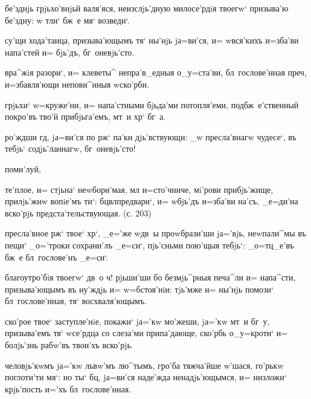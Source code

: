 
  бе'зднjь грjьхо'внjьй валя'яся, 
неизслjь'дную милосе'рдiя твоегw` призыва'ю бе'здну: w\т 
тли` бж~е мя` возведи`.

 су'щи хода'таица, призыва'ющымъ тя` 
ны'нjь jа=ви'ся, и= w\т вся'кихъ и=зба'ви напа'стей и= 
бjь'дъ, бг~оневjь'сто.

 вра^жiя разори`, и= клеветы^ 
непра'в_едныя о_у=ста'ви, бл~гослове'нная преч, 
и=збавля'ющи непови^нныя w\т ско'рби.

  грjьхи` w=круже'ни, и= напа'стными 
бjьда'ми потопля'еми, под\ъ бж~е'ственный покро'въ тво'й 
прибjьга'емъ, мт~и хр` бг~а.

   ро'ждши гд, jа=ви'ся 
по рж` па'ки дjь'вствующи: _w пресла'внагw чудесе`, 
въ тебjь` содjь'ланнагw, бг~оневjь'сто!

  поми'луй, 


 те'плое, и= стjьна` неwбори'мая, мл 
и=сто'чниче, мi'рови прибjь'жище, прилjь'жнw вопiе'мъ 
ти`: бц вл предвари`, и= w\т бjь'дъ и=зба'ви 
на'съ, _е=ди'на вско'рjь предста'тельствующая. (с. 203)


 пресла'вное рж` твое` хр`, 
_е='же w\т дв~ы проwбрази'ши jа='вjь, неwпали^мы въ пещи` 
_о='троки сохрани'лъ _е=си`, пjь'сньми пою'щыя тебjь`: 
_о=тц_е'въ бж~е бл~гослове'нъ _е=си`.

 благоутро'бiя твоегw` дв~о ч! рjьши'ши бо 
безмjь^рныя печа^ли и= напа^сти, призыва'ющымъ въ ну'ждjь 
и= w=бстоя'нiи: тjь'мже и= ны'нjь помози` 
бл~гослове'нная, тя` восхваля'ющымъ.

 ско'рое твое` заступле'нiе, покажи` jа='кw 
мо'жеши, jа='кw мт~и бг~у, призыва'емъ тя` w\т се'рдца со 
слеза'ми припа'дающе, ско'рбь о_у=кроти` и= болjь'знь 
рабw'въ твои'хъ вско'рjь.

  человjь'кwмъ jа='кw львw'мъ 
лю^тымъ, гро'ба тяжча'йше w'шася, го'рькw 
поглоти'ти мя`: но ты` бц, jа=ви'ся наде'жда 
ненадjь'ющымся, и= низложи` крjь'пость и='хъ 
бл~гослове'нная.

